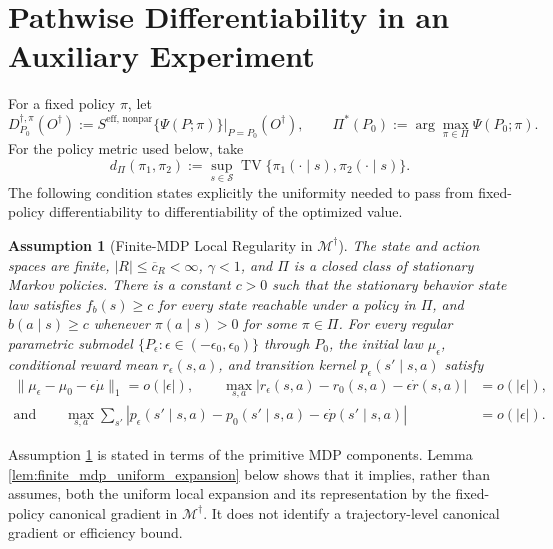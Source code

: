 \documentclass[12pt]{article}
\newtheorem{assumption}{Assumption}
\theoremstyle{remark}\newtheorem{remark}[theorem]{Remark}\theoremstyle{plain}
\newcommand{\EIF}{S^{\text{eff, nonpar}}}
\begin{document}
\section{Pathwise Differentiability in an Auxiliary Experiment}
\label{sec:IFF_for_EIF}

For a fixed policy $\pi$, let
\[
    D_{P_0}^{\dagger,\pi}(O^\dagger)
    := \EIF\{\Psi(P;\pi)\}\big|_{P=P_0}(O^\dagger),
    \qquad
    \Pi^*(P_0):=\arg\max_{\pi\in\Pi}\Psi(P_0;\pi).
\]
For the policy metric used below, take
\[
    d_\Pi(\pi_1,\pi_2)
    :=\sup_{s\in\mathcal S}
    \operatorname{TV}\{\pi_1(\cdot\mid s),\pi_2(\cdot\mid s)\}.
\]
The following condition states explicitly the uniformity needed to pass
from fixed-policy differentiability to differentiability of the
optimized value.

\begin{assumption}[Finite-MDP Local Regularity in
$\mathcal M^\dagger$]\label{ass:regularity}
    The state and action spaces are finite,
    $|R|\leq\overline c_R<\infty$, $\gamma<1$, and $\Pi$ is a closed
    class of stationary
    Markov policies.  There is a constant $c>0$ such that the
    stationary behavior state law satisfies $f_b(s)\geq c$ for every
    state reachable under a policy in $\Pi$, and
    $b(a\mid s)\geq c$ whenever $\pi(a\mid s)>0$ for some
    $\pi\in\Pi$.
    For every regular parametric submodel
    $\{P_\epsilon:\epsilon\in(-\epsilon_0,\epsilon_0)\}$ through $P_0$,
    the initial law $\mu_\epsilon$, conditional reward mean
    $r_\epsilon(s,a)$, and transition kernel
    $p_\epsilon(s'\mid s,a)$ satisfy
    \[
        \begin{aligned}
        \|\mu_\epsilon-\mu_0-\epsilon\dot\mu\|_1
        =o(|\epsilon|),\qquad
        \max_{s,a}|r_\epsilon(s,a)-r_0(s,a)
        -\epsilon\dot r(s,a)|
        & =o(|\epsilon|),\\
        \text{and} \qquad \max_{s,a}\sum_{s'}
        |p_\epsilon(s'\mid s,a)-p_0(s'\mid s,a)
        -\epsilon\dot p(s'\mid s,a)|
        &=o(|\epsilon|).
        \end{aligned}
    \]
\end{assumption}

Assumption \ref{ass:regularity} is stated in terms of the primitive MDP
components.  
Lemma \ref{lem:finite_mdp_uniform_expansion} below shows
that it implies, rather than assumes, both the uniform local expansion
and its representation by the fixed-policy canonical gradient in
$\mathcal M^\dagger$.
It does not identify a trajectory-level
canonical gradient or efficiency bound.
\end{document}

